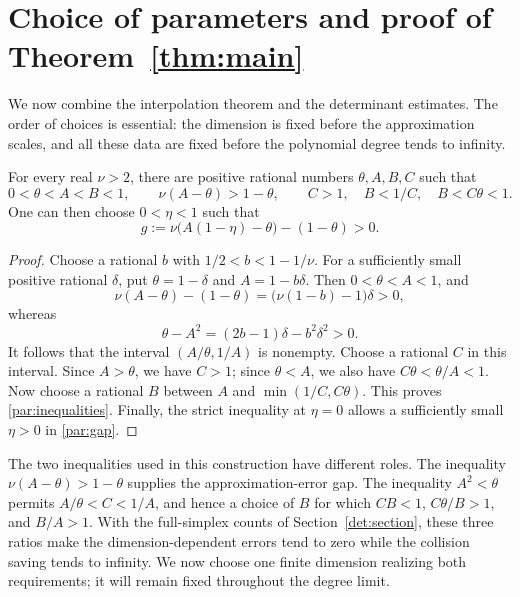 \section{Choice of parameters and proof of Theorem~\ref{thm:main}}
\label{sec:parameters}

We now combine the interpolation theorem and the determinant estimates.
The order of choices is essential: the dimension is fixed before the
approximation scales, and all these data are fixed before the polynomial
degree tends to infinity.

\begin{lemma}\label{par:constants}
For every real \(\nu>2\), there are positive rational numbers
\(\theta,A,B,C\) such that
\begin{equation}\label{par:inequalities}
0<\theta<A<B<1,\qquad
\nu(A-\theta)>1-\theta,\qquad
C>1,\quad B<1/C,\quad B<C\theta<1.
\end{equation}
One can then choose \(0<\eta<1\) such that
\begin{equation}\label{par:gap}
g:=\nu\bigl(A(1-\eta)-\theta\bigr)-(1-\theta)>0.
\end{equation}
\end{lemma}

\begin{proof}
Choose a rational \(b\) with \(1/2<b<1-1/\nu\).
For a sufficiently small positive rational \(\delta\), put
\(\theta=1-\delta\) and \(A=1-b\delta\). Then \(0<\theta<A<1\), and
\[
\nu(A-\theta)-(1-\theta)
=\bigl(\nu(1-b)-1\bigr)\delta>0,
\]
whereas
\[
\theta-A^2=(2b-1)\delta-b^2\delta^2>0.
\]
It follows that the interval \((A/\theta,1/A)\) is nonempty.
Choose a rational \(C\) in this interval. Since \(A>\theta\), we have
\(C>1\); since \(\theta<A\), we also have
\(C\theta<\theta/A<1\).
Now choose a rational \(B\) between \(A\) and
\(\min(1/C,C\theta)\). This proves \eqref{par:inequalities}.
Finally, the strict inequality at \(\eta=0\) allows a sufficiently
small \(\eta>0\) in \eqref{par:gap}.
\end{proof}

The two inequalities used in this construction have different roles.
The inequality \(\nu(A-\theta)>1-\theta\) supplies the
approximation-error gap. The inequality \(A^2<\theta\) permits
\(A/\theta<C<1/A\), and hence a choice of \(B\) for which
\(CB<1\), \(C\theta/B>1\), and \(B/A>1\). With the full-simplex
counts of Section~\ref{det:section}, these three ratios make the
dimension-dependent errors tend to zero while the collision saving
tends to infinity. We now choose one finite dimension realizing
both requirements; it will remain fixed throughout the degree limit.

